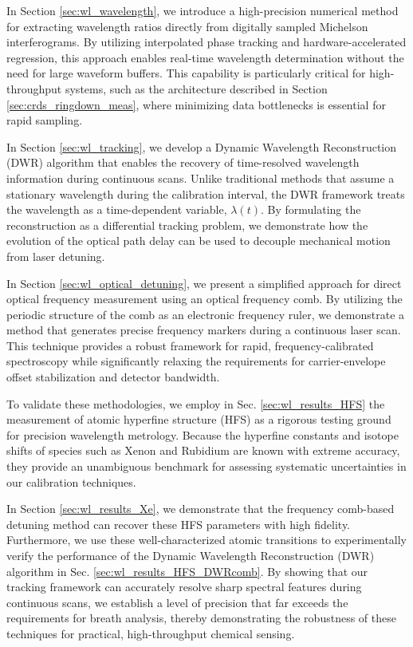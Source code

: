 \documentclass[12pt]{report}
\begin{document}
	In Section \ref{sec:wl_wavelength}, we introduce a high-precision numerical method for extracting wavelength ratios directly from digitally sampled Michelson interferograms. By utilizing interpolated phase tracking and hardware-accelerated regression, this approach enables real-time wavelength determination without the need for large waveform buffers. This capability is particularly critical for high-throughput systems, such as the architecture described in Section \ref{sec:crds_ringdown_meas}, where minimizing data bottlenecks is essential for rapid sampling.
	
	In Section \ref{sec:wl_tracking}, we develop a Dynamic Wavelength Reconstruction (DWR) algorithm that enables the recovery of time-resolved wavelength information during continuous scans. Unlike traditional methods that assume a stationary wavelength during the calibration interval, the DWR framework treats the wavelength as a time-dependent variable, $\lambda(t)$. By formulating the reconstruction as a differential tracking problem, we demonstrate how the evolution of the optical path delay can be used to decouple mechanical motion from laser detuning.
	
	In Section \ref{sec:wl_optical_detuning}, we present a simplified approach for direct optical frequency measurement using an optical frequency comb. By utilizing the periodic structure of the comb as an electronic frequency ruler, we demonstrate a method that generates precise frequency markers during a continuous laser scan. This technique provides a robust framework for rapid, frequency-calibrated spectroscopy while significantly relaxing the requirements for carrier-envelope offset stabilization and detector bandwidth.
	
	To validate these methodologies, we employ in Sec. \ref{sec:wl_results_HFS} the measurement of atomic hyperfine structure (HFS) as a rigorous testing ground for precision wavelength metrology. Because the hyperfine constants and isotope shifts of species such as Xenon and Rubidium are known with extreme accuracy, they provide an unambiguous benchmark for assessing systematic uncertainties in our calibration techniques. 
	
	In Section \ref{sec:wl_results_Xe}, we demonstrate that the frequency comb-based detuning method can recover these HFS parameters with high fidelity. Furthermore, we use these well-characterized atomic transitions to experimentally verify the performance of the Dynamic Wavelength Reconstruction (DWR) algorithm in Sec. \ref{sec:wl_results_HFS_DWRcomb}. By showing that our tracking framework can accurately resolve sharp spectral features during continuous scans, we establish a level of precision that far exceeds the requirements for breath analysis, thereby demonstrating the robustness of these techniques for practical, high-throughput chemical sensing.
	
\end{document}
